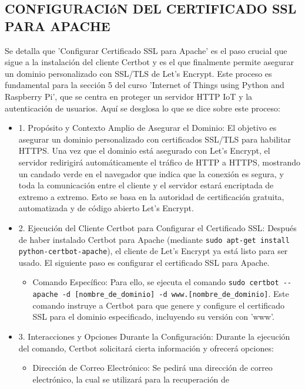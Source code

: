 \documentclass{report}
\begin{document}
\subsection{CONFIGURACIóN DEL CERTIFICADO SSL PARA APACHE}
Se detalla que 'Configurar Certificado SSL para Apache' es el paso crucial que sigue a la instalación del cliente Certbot 
y es el que finalmente permite asegurar un dominio personalizado con SSL/TLS de Let's Encrypt. Este proceso es fundamental para la 
sección 5 del curso 'Internet of Things using Python and Raspberry Pi', que se centra en proteger un servidor HTTP IoT y la 
autenticación de usuarios.
Aquí se desglosa lo que se  dice sobre este proceso:
\begin{itemize}
    \item 1. Propósito y Contexto Amplio de Asegurar el Dominio: El objetivo es asegurar un dominio personalizado con certificados 
    SSL/TLS para habilitar HTTPS. Una vez que el dominio está asegurado con Let's Encrypt, el servidor redirigirá automáticamente el 
    tráfico de HTTP a HTTPS, mostrando un candado verde en el navegador que indica que la conexión es segura, y toda la comunicación entre 
    el cliente y el servidor estará encriptada de extremo a extremo. Esto se basa en la autoridad de certificación gratuita, automatizada y 
    de código abierto Let's Encrypt.
    \item 2. Ejecución del Cliente Certbot para Configurar el Certificado SSL: Después de haber instalado Certbot para Apache 
    (mediante \verb|sudo apt-get install python-certbot-apache|), el cliente de Let's Encrypt ya está listo para ser usado. El siguiente 
    paso es configurar el certificado SSL para Apache.
        \begin{itemize}
            \item Comando Específico: Para ello, se ejecuta el comando \verb|sudo certbot --apache -d [nombre_de_dominio] -d www.[nombre_de_dominio]|. 
            Este comando instruye a Certbot para que genere y configure el certificado SSL para el dominio especificado, incluyendo su 
            versión con 'www'.        
        \end{itemize}
    \item 3. Interacciones y Opciones Durante la Configuración: Durante la ejecución del comando, Certbot solicitará cierta información y 
    ofrecerá opciones:
        \begin{itemize}
            \item Dirección de Correo Electrónico: Se pedirá una dirección de correo electrónico, la cual se utilizará para la recuperación de 

\end{itemize}
\end{itemize}
\end{document}
